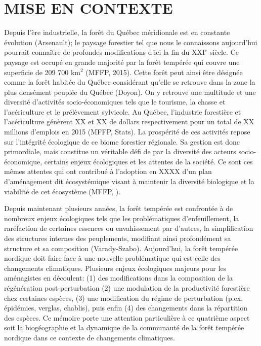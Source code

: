 
\section*{\uppercase{Mise en contexte}}

Depuis l'ère industrielle, la forêt du Québec méridionale est en constante évolution (Arsenault); le paysage forestier tel que nous le connaissons aujourd'hui pourrait connaître de profondes modifications d'ici la fin du XXI$^e$ siècle. Ce paysage est occupé en grande majorité par la forêt tempérée qui couvre une superficie de 209 700 km$^2$ (MFFP, 2015). Cette forêt peut ainsi être désignée comme la forêt habitée du Québec considérant qu'elle se retrouve dans la zone la plus densément peuplée du Québec (Doyon). On y retrouve une multitude et une diversité d'activités socio-économiques tels que le tourisme, la chasse et l'acériculture et le prélèvement sylvicole. Au Québec, l'industrie forestière et l'acériculture génèrent XX et XX de dollars respectivement pour un total de XX millions d'emplois en 2015 (MFFP, Stats). La prospérité de ces activités repose sur l'intégrité écologique de ce biome forestier régionale. Sa gestion est donc primordiale, mais constitue un véritable défi de par la diversité des acteurs socio-économique, certains enjeux écologiques et les attentes de la société. Ce sont ces mêmes attentes qui ont contribué à l'adoption en XXXX d'un plan d'aménagement dit écosystémique visant à maintenir la diversité biologique et la viabilité de cet écosystème (MFFP, ).

Depuis maintenant plusieurs années, la forêt tempérée est confrontée à de nombreux enjeux écologiques tels que les problématiques d'enfeuillement, la raréfaction de certaines essences ou envahissement par d’autres, la simplification des structures internes des peuplements, modifiant ainsi profondément sa structure et sa composition (Varady-Szabo). Aujourd'hui, la forêt tempérée nordique doit faire face à une nouvelle problématique qui est celle des changements climatiques. Plusieurs enjeux écologiques majeurs pour les aménagistes en découlent: (1) des modifications dans la composition de la régénération post-perturbation (2) une modulation de la productivité forestière chez certaines espèces, (3) une modification du régime de perturbation (p.ex. épidémies, verglas, chablis), puis enfin (4) des changements dans la répartition des espèces. Ce mémoire porte une attention particulière à ce quatrième aspect soit la biogéographie et la dynamique de la communauté de la forêt tempérée nordique dans ce contexte de changements climatiques.

